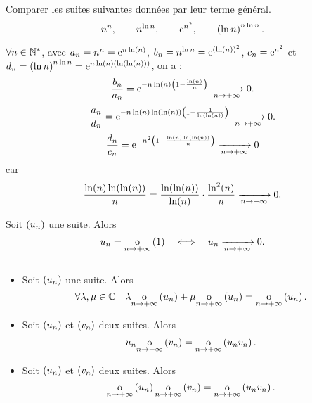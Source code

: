 \documentclass{magnolia}
\begin{document}
\begin{exoUnique}
\exo Comparer les suites suivantes données par leur terme général.
  \[n^n, \qquad n^{\ln n}, \qquad {\rm e}^{n^2}, \qquad \left(\ln n\right)^{n\ln n}.\]
\end{exoUnique}

\begin{sol}
$\forall n \in {\mathbb{N}^*}$, avec $a_n=n^n={\rm e}^{n\ln(n)}$, $b_n=n^{\ln n}={\rm e}^{\left(\ln(n)\right)^2}$, $c_n={\rm e}^{n^2}$ et $d_n=\left(\ln n\right)^{n\ln n}={\rm e}^{n\ln(n)\left(\ln(\ln(n))\right)}$, on a :
$$\frac{b_n}{a_n}={\rm e}^{-n\ln(n)\left(1-\frac{\ln(n)}{n}\right)}\xrightarrow[n\rightarrow +\infty]{}{0}.$$
$$\frac{a_n}{d_n}={\rm e}^{-n\ln(n)\ln(\ln(n))\left(1-\frac{1}{\ln(\ln(n))}\right)}\xrightarrow[n\rightarrow +\infty]{}{0}.$$
$$\frac{d_n}{c_n}={\rm e}^{-n^2\left(1-\frac{\ln(n)\ln(\ln(n))}{n}\right)}\xrightarrow[n\rightarrow +\infty]{}{0}$$ car $$\frac{\ln(n)\ln(\ln(n))}{n}=\frac{\ln(\ln(n))}{\ln(n)}\cdot \frac{\ln^2(n)}{n}\xrightarrow[n\rightarrow +\infty]{}{0}.$$

\end{sol}

\begin{proposition}[utile=-3]
Soit $\left(u_n\right)$ une suite. Alors
\[u_n=\underset{n \rightarrow +\infty}{\text{o}}\left(1\right) \quad\Longleftrightarrow\quad u_n\xrightarrow[n\rightarrow +\infty]{} 0.\]
\end{proposition}

\begin{proposition}[utile=-3]
$\quad$
\begin{itemize}
\item Soit $\left(u_n\right)$ une suite. Alors
  \[\forall \lambda,\mu\in\mathbb{C} \quad \lambda \underset{n \rightarrow +\infty}{\text{o}}\left(u_n\right)
    +\mu\underset{n \rightarrow +\infty}{\text{o}}\left(u_n\right)=\underset{n \rightarrow +\infty}{\text{o}}\left(u_n\right).\]
\item Soit $\left(u_n\right)$ et $\left(v_n\right)$ deux suites. Alors
  \[u_n \underset{n \rightarrow +\infty}{\text{o}}\left(v_n\right)=\underset{n \rightarrow +\infty}{\text{o}}\left(u_n v_n\right).\]
\item Soit $\left(u_n\right)$ et $\left(v_n\right)$ deux suites. Alors
  \[\underset{n \rightarrow +\infty}{\text{o}}\left(u_n\right)\underset{n \rightarrow +\infty}{\text{o}}\left(v_n\right)=
    \underset{n \rightarrow +\infty}{\text{o}}\left(u_n v_n\right).\]
\end{itemize}
\end{proposition}

\end{document}
